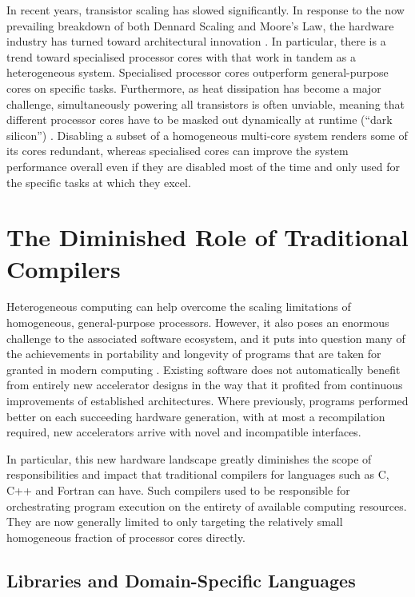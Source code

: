     In recent years, transistor scaling has slowed significantly.
    In response to the now prevailing breakdown of both Dennard Scaling and
    Moore's Law, the hardware industry has turned toward architectural
    innovation \citep{7878935}.
    In particular, there is a trend toward specialised processor cores with
    that work in tandem as a heterogeneous system.
    Specialised processor cores outperform general-purpose cores on specific
    tasks.
    Furthermore, as heat dissipation has become a major challenge,
    simultaneously powering all transistors is often unviable, meaning that
    different processor cores have to be masked out dynamically at runtime
    (``dark silicon'') \citep{6307773}.
    Disabling a subset of a homogeneous multi-core system renders some of its
    cores redundant, whereas specialised cores can improve the system
    performance overall even if they are disabled most of the time and only
    used for the specific tasks at which they excel.

\section{The Diminished Role of Traditional Compilers}

    Heterogeneous computing can help overcome the scaling limitations of
    homogeneous, general-purpose processors.
    However, it also poses an enormous challenge to the associated software
    ecosystem, and it puts into question many of the achievements in portability
    and longevity of programs that are taken for granted in modern computing
    \citep{8719512}.
    Existing software does not automatically benefit from entirely new
    accelerator designs in the way that it profited from continuous
    improvements of established architectures.
    Where previously, programs performed better on each succeeding hardware
    generation, with at most a recompilation required, new accelerators arrive
    with novel and incompatible interfaces.

    In particular, this new hardware landscape greatly diminishes the scope of
    responsibilities and impact that traditional compilers for languages such as
    C, C++ and Fortran can have.
    Such compilers used to be responsible for orchestrating
    program execution on the entirety of available computing resources.
    They are now generally limited to only targeting the relatively small
    homogeneous fraction of processor cores directly.

\subsection{Libraries and Domain-Specific Languages}

